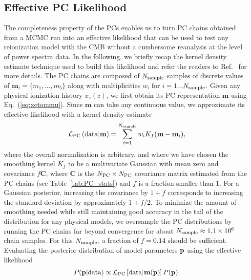 \documentclass[prd,twocolumn,amsmath,amssymb,floatfix,superscriptaddress,nofootinbib]{revtex4-1}
\newcommand{\sample}{{\rm sample}}
\newcommand{\beq}{\begin{equation}}
\newcommand{\eeq}{\end{equation}}
\begin{document}
%
%
%
%

\subsection{Effective PC Likelihood}
\label{sec:KDE}
The completeness property of the PCs enables us to turn PC chains obtained from a MCMC run into an effective likelihood that can be used to test any reionization model with the CMB without a cumbersome reanalysis at the level of power spectra data. In the following, we briefly recap the kernel density estimate technique used to build this likelihood and refer the readers to Ref.~\cite{Heinrich:2016ojb} for more details.
The PC chains are composed of $N_{\rm sample}$ samples of discrete values of $\mathbf{m}_i = \{m_1, \ldots, m_5\}$ along with multiplicities $w_i$ for $i = 1$...$N_{\rm sample}$. Given any physical ionization history $x_e(z)$, we first obtain its PC representation $\mathbf{m}$ using Eq.~(\ref{eq:xetommu}). Since $\mathbf{m}$ can take any continuous value, we approximate its effective likelihood with a kernel density estimate
\beq
{\cal L}_{\rm PC}\left({\rm data}|\mathbf{m} \right)  = \sum_{i = 1}^{N_{\rm sample}} w_i K_f(\mathbf{m}-\mathbf{m}_i),
\eeq
where the overall normalization is arbitrary, and where we have chosen the smoothing kernel $K_f$ to be a  multivariate Gaussian with mean zero and covariance $f\mathbf{C}$, where $\mathbf{C}$ is the $N_{\rm PC} \times N_{\rm PC}$ covariance matrix estimated from the PC chains (see Table~\ref{tab:PC_stats}) and $f$ is a fraction smaller than 1.
For a Gaussian posterior, increasing the covariance by $1+f$ corresponds to increasing the standard deviation by approximately $1+f/2$. To minimize the amount of smoothing needed while still maintaining good accuracy in the tail of the distribution for any physical models, we oversample the PC distributions by running the PC chains far beyond convergence for about $N_{\sample} \approx 1.1 \times 10^{6}$ chain samples. 
For this $N_{\sample}$, a fraction of $f = 0.14$ should be sufficient.
Evaluating the posterior distribution of model parameters $\bf p$ using the effective likelihood
\begin{equation}
P({\bf p}| {\rm data}) \propto {\cal L}_{\rm PC}\left[ {\rm data}|\mathbf{m}(\bf p) \right] P(\bf p).
\end{equation}
\end{document}
